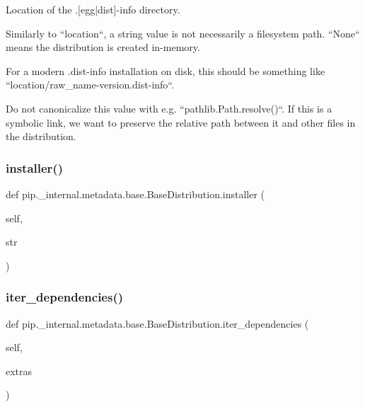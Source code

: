 \begin{DoxyVerb}Location of the .[egg|dist]-info directory.

Similarly to ``location``, a string value is not necessarily a
filesystem path. ``None`` means the distribution is created in-memory.

For a modern .dist-info installation on disk, this should be something
like ``{location}/{raw_name}-{version}.dist-info``.

Do not canonicalize this value with e.g. ``pathlib.Path.resolve()``. If
this is a symbolic link, we want to preserve the relative path between
it and other files in the distribution.
\end{DoxyVerb}
 \mbox{\label{classpip_1_1__internal_1_1metadata_1_1base_1_1BaseDistribution_abd4aac6ed6c320b773d64e1458877f81}} 
\subsubsection{\texorpdfstring{installer()}{installer()}}
{\footnotesize\ttfamily def pip.\+\_\+internal.\+metadata.\+base.\+Base\+Distribution.\+installer (\begin{DoxyParamCaption}\item[{}]{self,  }\item[{}]{str }\end{DoxyParamCaption})}

\mbox{\label{classpip_1_1__internal_1_1metadata_1_1base_1_1BaseDistribution_a23234701cfb484f8e9eed299deb89e67}} 
\subsubsection{\texorpdfstring{iter\+\_\+dependencies()}{iter\_dependencies()}}
{\footnotesize\ttfamily def pip.\+\_\+internal.\+metadata.\+base.\+Base\+Distribution.\+iter\+\_\+dependencies (\begin{DoxyParamCaption}\item[{}]{self,  }\item[{}]{extras }\end{DoxyParamCaption})}

